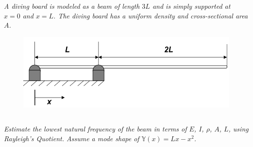 \section{}
\textit{A diving board is modeled as a beam of length $3L$ and is simply supported at $x = 0$ and $x = L$. The diving board has a uniform density and cross-sectional area $A$.}

\begin{figure}[H]
    \centering
    \includegraphics[width=0.6\linewidth]{Questions/Figures/Q5 Problem Statement a).png}
\end{figure}

\subsection{}
\textit{Estimate the lowest natural frequency of the beam in terms of $E$, $I$, $\rho$, $A$, $L$, using Rayleigh’s Quotient. Assume a mode shape of $\mathbb{Y}(x) = Lx - x^2$.}

